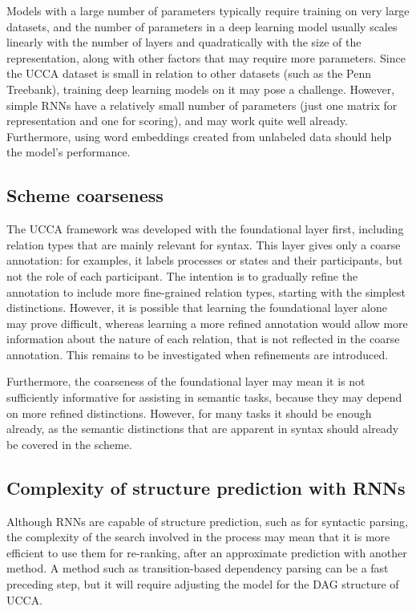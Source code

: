 \documentclass[11pt]{article}
\begin{document}
Models with a large number of parameters typically require training on very large datasets, and the number of parameters in a deep learning model usually scales linearly with the number of layers and quadratically with the size of the representation, along with other factors that may require more parameters. Since the UCCA dataset is small in relation to other datasets (such as the Penn Treebank), training deep learning models on it may pose a challenge. However, simple RNNs have a relatively small number of parameters (just one matrix for representation and one for scoring), and may work quite well already\cite{socher2010learning}. Furthermore, using word embeddings created from unlabeled data should help the model's performance\cite{collobert2008unified}.


\subsection{Scheme coarseness}

The UCCA framework was developed with the foundational layer first, including relation types that are mainly relevant for syntax. This layer gives only a coarse annotation: for examples, it labels processes or states and their participants, but not the role of each participant. The intention is to gradually refine the annotation to include more fine-grained relation types, starting with the simplest distinctions. However, it is possible that learning the foundational layer alone may prove difficult, whereas learning a more refined annotation would allow more information about the nature of each relation, that is not reflected in the coarse annotation. This remains to be investigated when refinements are introduced.

Furthermore, the coarseness of the foundational layer may mean it is not sufficiently informative for assisting in semantic tasks, because they may depend on more refined distinctions. However, for many tasks it should be enough already, as the semantic distinctions that are apparent in syntax should already be covered in the scheme.


\subsection{Complexity of structure prediction with RNNs}

Although RNNs are capable of structure prediction, such as for syntactic parsing\cite{socher2010learning}, the complexity of the search involved in the process may mean that it is more efficient to use them for re-ranking, after an approximate prediction with another method\cite{socher2013parsing}\cite{le2014inside}. A method such as transition-based dependency parsing can be a fast preceding step\cite{chen2014fast}, but it will require adjusting the model for the DAG structure of UCCA.





\end{document}

